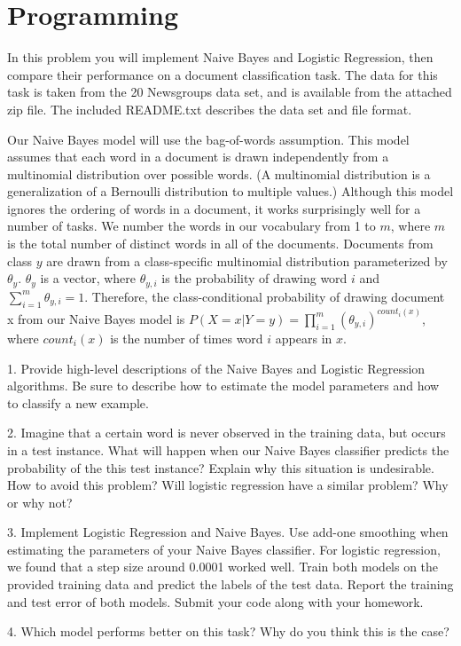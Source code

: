 \documentclass{article}
\theoremstyle{definition}
\theoremstyle{definition}
\theoremstyle{remark}
\begin{document}
\section*{Programming}
In this problem you will implement Naive Bayes and Logistic Regression, then compare their performance on a
document classification task. The data for this task is taken from the 20 Newsgroups data set, and is available
from the attached zip file. The included README.txt describes the data set and file format.

Our Naive Bayes model will use the bag-of-words assumption. This model assumes that each word in a
document is drawn independently from a multinomial distribution over possible words. (A multinomial
distribution is a generalization of a Bernoulli distribution to multiple values.) Although this model ignores
the ordering of words in a document, it works surprisingly well for a number of tasks. We number the words
in our vocabulary from 1 to $m$, where $m$ is the total number of distinct words in all of the documents.
Documents from class $y$ are drawn from a class-specific multinomial distribution parameterized by $\theta_y$. $\theta_y$ is
a vector, where $\theta_{y,i}$ is the probability of drawing word $i$ and $\sum_{i=1}^m \theta_{y,i}=1$.
Therefore, the class-conditional probability of drawing document x from our Naive Bayes model is
$P(X = x|Y = y) = \prod_{i=1}^m (\theta_{y,i})^{count_i(x)}$, where $count_i(x)$ is the number of times word $i$ appears in $x$.

1. Provide high-level descriptions of the Naive Bayes and Logistic Regression algorithms. Be
sure to describe how to estimate the model parameters and how to classify a new example.

2. Imagine that a certain word is never observed in the training data, but occurs in a test
instance. What will happen when our Naive Bayes classifier predicts the probability of the this test
instance? Explain why this situation is undesirable. How to avoid this problem? Will logistic regression have a similar problem?
Why or why not?

3. Implement Logistic Regression and Naive Bayes. Use add-one smoothing when estimating
the parameters of your Naive Bayes classifier. For logistic regression, we found that a step size around
0.0001 worked well. Train both models on the provided training data and predict the labels of the test
data. Report the training and test error of both models. Submit your code along with your homework.

4. Which model performs better on this task? Why do you think this is the case?




\end{document}
